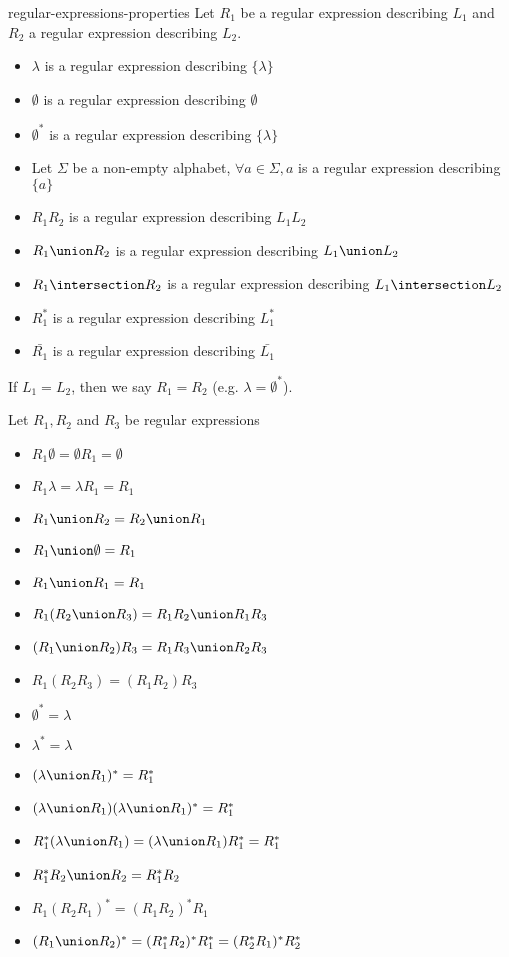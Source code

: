 \documentclass[preview]{standalone}
\newcommand{\emptyString}{\lambda}
\begin{document}
\begin{snippet}{regular-expressions-properties}
    Let \(R_1\) be a regular expression describing \(L_1\) and \(R_2\) a regular expression
    describing \(L_2\).

    \begin{itemize}
        \item \(\emptyString\) is a regular expression describing  \(\{\emptyString\}\)
        \item \(\emptyset\) is a regular expression describing \(\emptyset\)
        \item \(\emptyset^*\) is a regular expression describing \(\{\emptyString\}\)
        \item Let \(\Sigma\) be a non-empty alphabet, \(\forall a \in \Sigma, a\) is a regular expression describing \(\{a\}\)
        \item \(R_1R_2\) is a regular expression describing \(L_1L_2\)
        \item \(R_1\union R_2\) is a regular expression describing \(L_1\union L_2\)
        \item \(R_1\intersection R_2\) is a regular expression describing \(L_1\intersection L_2\)
        \item \(R_1^*\) is a regular expression describing \(L_1^*\)
        \item \(\bar{R_1}\) is a regular expression describing \(\bar{L_1}\)
    \end{itemize}
    If \(L_1 = L_2\), then we say \(R_1 = R_2\) (e.g. \(\emptyString = \emptyset^*\)).

    Let \(R_1, R_2\) and \(R_3\) be regular expressions
    \begin{itemize}
        \item \(R_1 \emptyset = \emptyset R_1 = \emptyset\)
        \item \(R_1 \emptyString = \emptyString R_1 = R_1\)
        \item \(R_1 \union R_2 = R_2 \union R_1\)
        \item \(R_1 \union \emptyset = R_1\)
        \item \(R_1 \union R_1 = R_1\)
        \item \(R_1(R_2 \union R_3) = R_1R_2 \union R_1R_3\)
        \item \((R_1 \union R_2)R_3 = R_1R_3 \union R_2R_3\)
        \item \(R_1(R_2R_3) = (R_1R_2)R_3\)
        \item \(\emptyset^*=\emptyString\)
        \item \(\emptyString^*=\emptyString\)
        \item \((\emptyString \union R_1)^* = R_1^*\)
        \item \((\emptyString \union R_1)(\emptyString \union R_1)^* = R_1^*\)
        \item \(R_1^*(\emptyString \union R_1)=(\emptyString \union R_1)R_1^* = R_1^*\)
        \item \(R_1^*R_2 \union R_2 = R_1^*R_2\)
        \item \(R_1(R_2R_1)^*=(R_1R_2)^*R_1\)
        \item \((R_1 \union R_2)^* = (R_1^*R_2)^*R_1^* = (R_2^*R_1)^*R_2^*\)
    \end{itemize}
\end{snippet}
\end{document}
